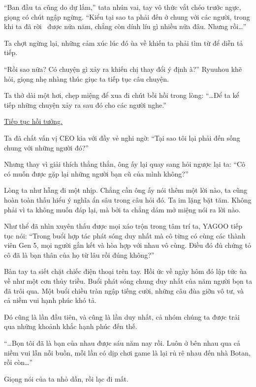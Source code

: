 \documentclass[../main.tex]{subfiles}
\begin{document}
``Ban đầu ta cũng do dự lắm,'' tata nhún vai, tay vô thức vắt chéo trước ngực, giọng có chút ngập ngừng. ``Kiểu tại sao ta phải đến ở chung với các người, trong khi ta đã rời \hll\ được nửa năm, chẳng còn dính líu gì nhiều nữa đâu. Nhưng rồi\dots''

Ta chợt ngừng lại, những cảm xúc lúc đó ùa về khiến ta phải tìm từ để diễn tả tiếp.

``Rồi sao nữa? Có chuyện gì xảy ra khiến chị thay đổi ý định à?'' Ryuuhou khẽ hỏi, giọng nhẹ nhàng thúc giục ta tiếp tục câu chuyện.

Ta thở dài một hơi, chẹp miệng để xua đi chút bồi hồi trong lòng: ``\dots Để ta kể tiếp những chuyện xảy ra sau đó cho các người nghe.''

\begin{center}
  \uline{Tiếp tục hồi tưởng.}
\end{center}

Ta đã chất vấn vị CEO kia với đầy vẻ nghi ngờ: ``Tại sao tôi lại phải đến sống chung với những người đó?''

Nhưng thay vì giải thích thẳng thắn, ông ấy lại quay sang hỏi ngược lại ta: ``Cô có muốn được gặp lại những người bạn cũ của mình không?''

Lòng ta như hẫng đi một nhịp. Chẳng cần ông ấy nói thêm một lời nào, ta cũng hoàn toàn thấu hiểu ý nghĩa ẩn sâu trong câu hỏi đó. Ta im lặng bặt tăm. Không phải vì ta không muốn đáp lại, mà bởi ta chẳng dám mở miệng nói ra lời nào.

Như thể đã nhìn xuyên thấu được mọi xáo trộn trong tâm trí ta, YAGOO tiếp tục nói: ``Trong buổi hợp tác phát sóng duy nhất mà cô từng có cùng các thành viên Gen 5, mọi người gắn kết và hòa hợp với nhau vô cùng. Điều đó đủ chứng tỏ cô đã là bạn thân của họ từ lâu rồi đúng không?''

Bàn tay ta siết chặt chiếc điện thoại trên tay. Hồi ức về ngày hôm đó lập tức ùa về như một cơn thủy triều. Buổi phát sóng chung duy nhất của năm người bọn ta đã trôi qua. Một buổi chiều tràn ngập tiếng cười, những câu đùa giỡn vô tư, và cả niềm vui hạnh phúc khó tả.

Đó cũng là lần đầu tiên, và cũng là lần duy nhất, cả nhóm chúng ta được trải qua những khoảnh khắc hạnh phúc đến thế.

``\dots Bọn tôi đã là bạn của nhau được sáu năm nay rồi. Luôn ở bên nhau qua cả niềm vui lẫn nỗi buồn, mỗi lần có dịp chơi game là lại rủ rê nhau đến nhà Botan, rồi còn\dots''

Giọng nói của ta nhỏ dần, rồi lạc đi mất.
\end{document}
